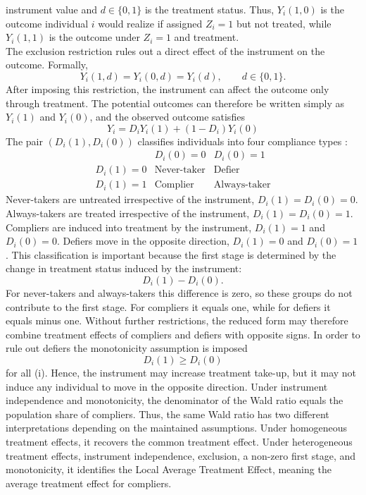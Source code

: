 \documentclass[12pt, a4paper, oneside]{article}
\theoremstyle{plain}
\theoremstyle{definition}
\begin{document}
instrument value and $d \in \{0,1\}$ is the treatment status. Thus, $Y_i(1,0)$ 
is the outcome individual $i$ would realize if assigned $Z_i=1$ but not treated, 
while $Y_i(1,1)$ is the outcome under $Z_i=1$ and treatment.\\
The exclusion restriction rules out a direct effect of the instrument on the outcome. Formally,
\begin{equation}
    Y_i(1,d)=Y_i(0,d)=Y_i(d), \qquad d \in \{0,1\}.
\end{equation}
After imposing this restriction, the instrument can affect the outcome only through 
treatment. The potential outcomes can therefore be written simply as $Y_i(1)$ and 
$Y_i(0)$, and the observed outcome satisfies
\begin{equation}
    Y_i = D_i Y_i(1) + (1-D_i) Y_i(0)
\end{equation}
The pair $(D_i(1),D_i(0))$ classifies individuals into four compliance types \citep{angrist1996identification}:
$$\begin{array}{c|cc}
 & D_i(0)=0 & D_i(0)=1 \\
\hline
D_i(1)=0 & \text{Never-taker} & \text{Defier} \\
D_i(1)=1 & \text{Complier} & \text{Always-taker}
\end{array}$$
Never-takers are untreated irrespective of the instrument, $D_i(1)=D_i(0)=0$. 
Always-takers are treated irrespective of the instrument, $D_i(1)=D_i(0)=1$. 
Compliers are induced into treatment by the instrument, $D_i(1)=1$ and $D_i(0)=0$. 
Defiers move in the opposite direction, $D_i(1)=0$ and $D_i(0)=1$.
This classification is important because the first stage is determined by the change in treatment status induced by the instrument:
\begin{equation}
D_i(1)-D_i(0).
\end{equation}
For never-takers and always-takers this difference is zero, so these groups do not contribute to the first stage. For compliers it equals one, while for defiers it equals minus one. Without further restrictions, the reduced form may therefore combine treatment effects of compliers and defiers with opposite signs.
In order to rule out defiers the monotonicity assumption is imposed 
\begin{equation}
D_i(1) \geq D_i(0)
\end{equation}
for all (i).
Hence, the instrument may increase treatment take-up, but it may not induce any individual to move in the opposite direction.
Under instrument independence and monotonicity, the denominator of the Wald ratio equals the population share of compliers.
Thus, the same Wald ratio has two different interpretations depending on the maintained assumptions. Under homogeneous treatment effects, it recovers the common treatment effect. Under heterogeneous treatment effects, instrument independence, exclusion, a non-zero first stage, and monotonicity, it identifies the Local Average Treatment Effect, meaning the average treatment effect for compliers\citep{angrist1995identification, angrist1996identification}.
\end{document}
